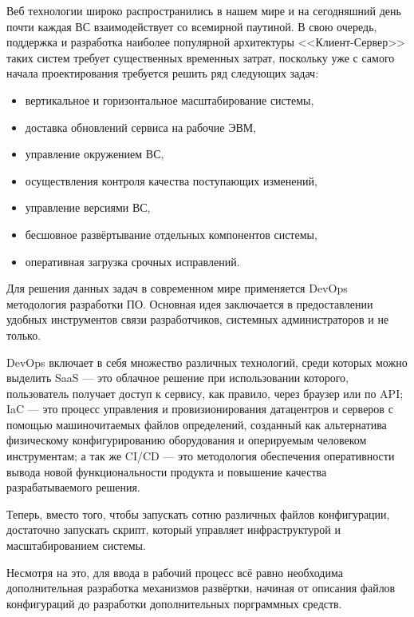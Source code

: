 \Introduction

Веб технологии широко распространились в нашем мире и на сегодняшний день почти каждая ВС взаимодействует со всемирной паутиной.
В свою очередь, поддержка и разработка наиболее популярной архитектуры <<Клиент-Сервер>> таких систем требует существенных временных затрат, поскольку уже с самого начала проектирования требуется решить ряд следующих задач:

\begin{itemize}
    \item вертикальное и горизонтальное масштабирование системы,
    \item доставка обновлений сервиса на рабочие ЭВМ,
    \item управление окружением ВС,
    \item осуществления контроля качества поступающих изменений,
    \item управление версиями ВС,
    \item бесшовное развёртывание отдельных компонентов системы,
    \item оперативная загрузка срочных исправлений.
\end{itemize}

Для решения данных задач в современном мире применяется DevOps методология разработки ПО\cite{projectPhoenix}.
Основная идея заключается в предоставлении удобных инструментов связи разработчиков, системных администраторов и не только.

DevOps включает в себя множество различных технологий, среди которых можно выделить
SaaS --- это облачное решение при использовании \cite{cd}
которого, пользователь получает доступ к сервису, как правило, через браузер или по API;
IaC --- это процесс управления и провизионирования датацентров и серверов с помощью машиночитаемых файлов определений,
созданный как альтернатива физическому конфигурированию оборудования и оперируемым человеком инструментам;
а так же CI/CD --- это методология обеспечения оперативности вывода новой функциональности продукта и повышение качества разрабатываемого решения\cite{ciCd}.

Теперь, вместо того, чтобы запускать сотню различных файлов конфигурации,
достаточно запускать скрипт, который управляет инфраструктурой и масштабированием системы.

Несмотря на это, для ввода в рабочий процесс всё равно необходима дополнительная разработка механизмов развёртки,
начиная от описания файлов конфигураций до разработки дополнительных порграммных средств.

